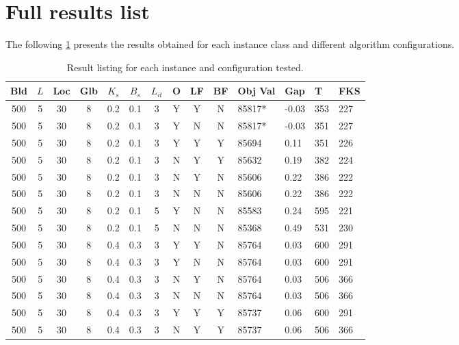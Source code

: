 \documentclass[a4paper, twocolumn, oneside, 10pt]{article}
\begin{document}
\section{Full results list}\label{sec:full-report}
The following \cref{tab:full-results} presents the results obtained for each instance class and different algorithm configurations.
\begin{longtable}{|ccccccccccllll|}
	\caption{Result listing for each instance and configuration tested.}\label{tab:full-results}\\
	\hline \footnotesize\textbf{Bld} & \footnotesize\textbf{\(L\)} & \footnotesize\textbf{Loc} & \footnotesize\textbf{Glb} & \footnotesize\textbf{\(K_s\)} & \footnotesize\textbf{\(B_s\)} & \footnotesize\textbf{\(L_{it}\)} & \footnotesize\textbf{O} & \footnotesize\textbf{LF} & \footnotesize\textbf{BF} & \footnotesize\textbf{Obj Val} & \footnotesize\textbf{Gap} & \footnotesize\textbf{T} & \footnotesize\textbf{FKS}\\
	\hline 500 & 5 & 30 & 8 & 0.2 & 0.1 & 3 & Y & Y & N & 85817* & -0.03 & 353 & 227\\
	500 & 5 & 30 & 8 & 0.2 & 0.1 & 3 & Y & N & N & 85817* & -0.03 & 351 & 227\\
	500 & 5 & 30 & 8 & 0.2 & 0.1 & 3 & Y & Y & Y & 85694 & 0.11 & 351 & 226\\
	500 & 5 & 30 & 8 & 0.2 & 0.1 & 3 & N & Y & Y & 85632 & 0.19 & 382 & 224\\
	500 & 5 & 30 & 8 & 0.2 & 0.1 & 3 & N & Y & N & 85606 & 0.22 & 386 & 222\\
	500 & 5 & 30 & 8 & 0.2 & 0.1 & 3 & N & N & N & 85606 & 0.22 & 386 & 222\\
	500 & 5 & 30 & 8 & 0.2 & 0.1 & 5 & Y & N & N & 85583 & 0.24 & 595 & 221\\
	500 & 5 & 30 & 8 & 0.2 & 0.1 & 5 & N & N & N & 85368 & 0.49 & 531 & 230\\
	500 & 5 & 30 & 8 & 0.4 & 0.3 & 3 & Y & Y & N & 85764 & 0.03 & 600 & 291\\
	500 & 5 & 30 & 8 & 0.4 & 0.3 & 3 & Y & N & N & 85764 & 0.03 & 600 & 291\\
	500 & 5 & 30 & 8 & 0.4 & 0.3 & 3 & N & Y & N & 85764 & 0.03 & 506 & 366\\
	500 & 5 & 30 & 8 & 0.4 & 0.3 & 3 & N & N & N & 85764 & 0.03 & 506 & 366\\
	500 & 5 & 30 & 8 & 0.4 & 0.3 & 3 & Y & Y & Y & 85737 & 0.06 & 600 & 291\\
	500 & 5 & 30 & 8 & 0.4 & 0.3 & 3 & N & Y & Y & 85737 & 0.06 & 506 & 366\\

\end{longtable}
\end{document}
